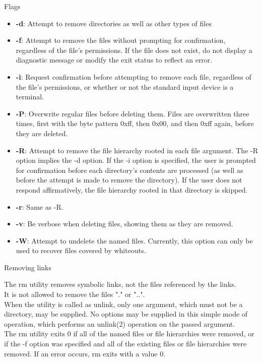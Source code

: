 \documentclass[hidelinks,12pt,a4paper,numbers=enddot]{scrartcl}
\begin{document}
Flags
\begin{itemize}
    \item  \textbf{-d}: Attempt to remove directories as well as other types of files
    \item  \textbf{-f}: Attempt to remove the files without prompting for confirmation, regardless
        of the file's permissions. If the file does not exist, do not display a diagnostic message
        or modify the exit status to reflect an error.
    \item  \textbf{-i}: Request confirmation before attempting to remove each file,
        regardless of the file's permissions, or whether or not the standard input device
        is a terminal.
    \item  \textbf{-P}: Overwrite regular files before deleting them. Files are overwritten
        three times, first with the byte pattern 0xff, then 0x00, and then 0xff again, before
        they are deleted.
    \item  \textbf{-R}: Attempt to remove the file hierarchy rooted in each file argument.
        The -R option implies the -d option.
        If the -i option is specified, the user is prompted for confirmation before
        each directory's contents are processed (as well as before the attempt is
        made to remove the directory).
        If the user does not respond affirmatively, the file hierarchy rooted in that
        directory is skipped.
    \item  \textbf{-r}: Same as -R.
    \item  \textbf{-v}: Be verbose when deleting files, showing them as they are removed.
    \item  \textbf{-W}: Attempt to undelete the named files.
        Currently, this option can only be used to recover files covered by whiteouts.
\end{itemize}

Removing links

The rm utility removes symbolic links, not the files referenced by the links.\\
It is not allowed to remove the files "." or "..".\\

When the utility is called as unlink, only one argument, which must not be a directory,
may be supplied. No options may be supplied in this simple mode of operation,
which performs an unlink(2) operation on the passed argument.\\

The rm utility exits 0 if all of the named files or file hierarchies were removed,
or if the -f option was specified and all of the existing files or file hierarchies were removed.
If an error occurs, rm exits with a value 0.
\end{document}
